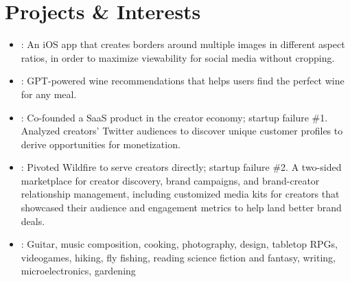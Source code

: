 \documentclass[letterpaper,11pt]{article}
\begin{document}
\section{Projects \& Interests}
\begin{itemize}[leftmargin=0pt]
  \item[]{\faLink\space \href{https://multiborder.io}{}}: An iOS app that creates borders around multiple images in different aspect ratios, in order to maximize viewability for social media without cropping. \\
  \item[]{\faLink\space \href{https://oeno.chat}{}}: GPT-powered wine recommendations that helps users find the perfect wine for any meal. \\
  \item[]{}: Co-founded a SaaS product in the creator economy; startup failure \#1. Analyzed creators' Twitter audiences to discover unique customer profiles to derive opportunities for monetization. \\
  \item[]{}: Pivoted Wildfire to serve creators directly; startup failure \#2. A two-sided marketplace for creator discovery, brand campaigns, and brand-creator relationship management, including customized media kits for creators that showcased their audience and engagement metrics to help land better brand deals. \\
  \item[]{}{}: Guitar, music composition, cooking, photography, design, tabletop RPGs, videogames, hiking, fly fishing, reading science fiction and fantasy, writing, microelectronics, gardening
\end{itemize}
\end{document}
